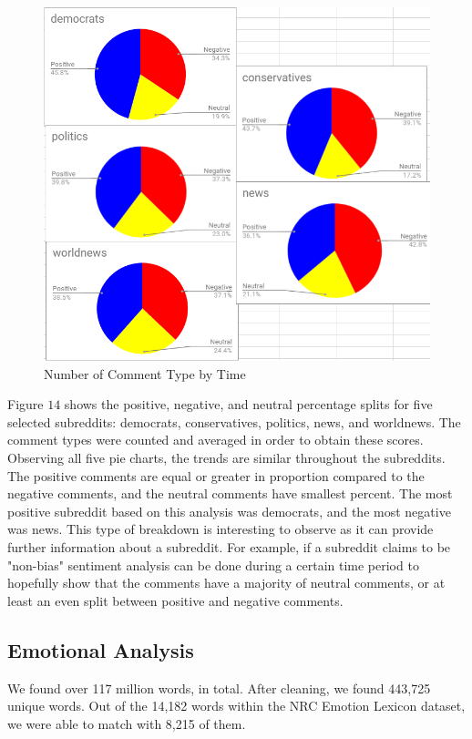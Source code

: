 \documentclass[letterpaper]{article}
\begin{document}
\begin{figure}[!htb]
\begin{center}
\includegraphics[scale=0.4]{Images/sentiment_subreddit_vertical.PNG}
\caption{Number of Comment Type by Time}
\label{fig1}
\end{center}
\end{figure}
\par
Figure $14$ shows the positive, negative, and neutral percentage splits for five selected subreddits: democrats, conservatives, politics, news, and worldnews. The comment types were counted and averaged in order to obtain these scores. Observing all five pie charts, the trends are similar throughout the subreddits. The positive comments are equal or greater in proportion compared to the negative comments, and the neutral comments have smallest percent. The most positive subreddit based on this analysis was democrats, and the most negative was news. This type of breakdown is interesting to observe as it can provide further information about a subreddit. For example, if a subreddit claims to be "non-bias" sentiment analysis can be done during a certain time period to hopefully show that the comments have a majority of neutral comments, or at least an even split between positive and negative comments.


\subsection{Emotional Analysis}
We found over 117 million words, in total. After cleaning, we found 443,725 unique words. Out of the 14,182 words within the NRC Emotion Lexicon dataset, we were able to match with 8,215 of them.
\end{document}
